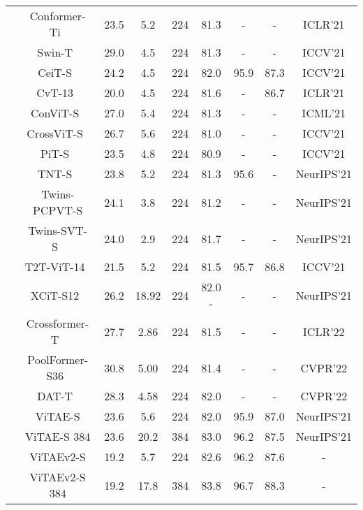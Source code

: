 \documentclass[twocolumn]{svjour3}          \smartqed  \usepackage{natbib}
\begin{document}
\begin{table*}[htbp]
{\begin{tabular}{c|c|ccc|cc|c|c}
          & Conformer-Ti~\citep{peng2021conformer} & 23.5  & 5.2   & 224   & 81.3  & - & - & ICLR'21\\
          & Swin-T~\citep{liu2021swin} & 29.0  & 4.5   & 224   & 81.3  & -     & - & ICCV'21 \\
          & CeiT-S~\citep{yuan2021incorporating} & 24.2  & 4.5   & 224   & 82.0  & 95.9  & 87.3 & ICCV'21 \\
          & CvT-13~\citep{wu2021cvt} & 20.0  & 4.5   & 224   & 81.6  & -     & 86.7 & ICLR'21 \\
          & ConViT-S~\citep{d2021convit} & 27.0  & 5.4  & 224   & 81.3  & -     & - & ICML'21 \\
          & CrossViT-S~\citep{chen2021crossvit} & 26.7  & 5.6  & 224   & 81.0  & -     & - & ICCV'21 \\
          & PiT-S~\citep{heo2021rethinking} & 23.5  & 4.8   & 224   & 80.9  & -     & - & ICCV'21 \\
          & TNT-S~\citep{han2021transformer} & 23.8  & 5.2  & 224   & 81.3  & 95.6  & - & NeurIPS'21 \\
          & Twins-PCPVT-S\citep{chu2021twins} & 24.1  & 3.8  & 224   & 81.2  & -  & - & NeurIPS'21 \\
          & Twins-SVT-S~\citep{chu2021twins} & 24.0 & 2.9 & 224 & 81.7 & - & - & NeurIPS'21 \\
          & T2T-ViT-14~\citep{yuan2021tokens} & 21.5  & 5.2   & 224   & 81.5  & 95.7  & 86.8 & ICCV'21 \\
          & XCiT-S12~\citep{el2021xcit} & 26.2 & 18.92 & 224 & 82.0 - & - & - & NeurIPS'21 \\
          & Crossformer-T~\citep{wang2021crossformer} & 27.7 & 2.86 & 224 & 81.5 & - & - & ICLR'22 \\
          & PoolFormer-S36~\citep{yu2022metaformer} &  30.8 & 5.00 & 224 & 81.4 & - & - & CVPR'22 \\
          & DAT-T~\citep{xia2022vision} &  28.3 & 4.58 & 224 & 82.0 & - & - &  CVPR'22 \\
          & ViTAE-S & 23.6  & 5.6   & 224   & 82.0  & 95.9  & 87.0 & NeurIPS'21 \\
          & {ViTAE-S  384} & 23.6   & 20.2   & 384   & 83.0  &  96.2  & 87.5 & NeurIPS'21 \\
          & {ViTAEv2-S} &  19.2  &  5.7 &  224 &    82.6    & 96.2  & 87.6 & - \\
          & {ViTAEv2-S  384} &  19.2  &  17.8  &  384 &    83.8    & 96.7  & 88.3 & - \\
    \hline
    \end{tabular}}
  \label{tab:ViTAESuppSota}\end{table*}
\end{document}

